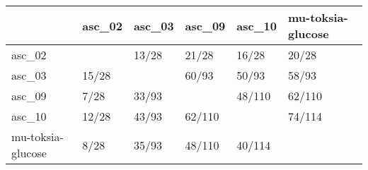 \begin{tabular}{llllll}
\toprule
{} & asc\_02 & asc\_03 &  asc\_09 &  asc\_10 & mu-toksia-glucose \\
\midrule
asc\_02            &        &  13/28 &   21/28 &   16/28 &             20/28 \\
asc\_03            &  15/28 &        &   60/93 &   50/93 &             58/93 \\
asc\_09            &   7/28 &  33/93 &         &  48/110 &            62/110 \\
asc\_10            &  12/28 &  43/93 &  62/110 &         &            74/114 \\
mu-toksia-glucose &   8/28 &  35/93 &  48/110 &  40/114 &                   \\
\bottomrule
\end{tabular}
